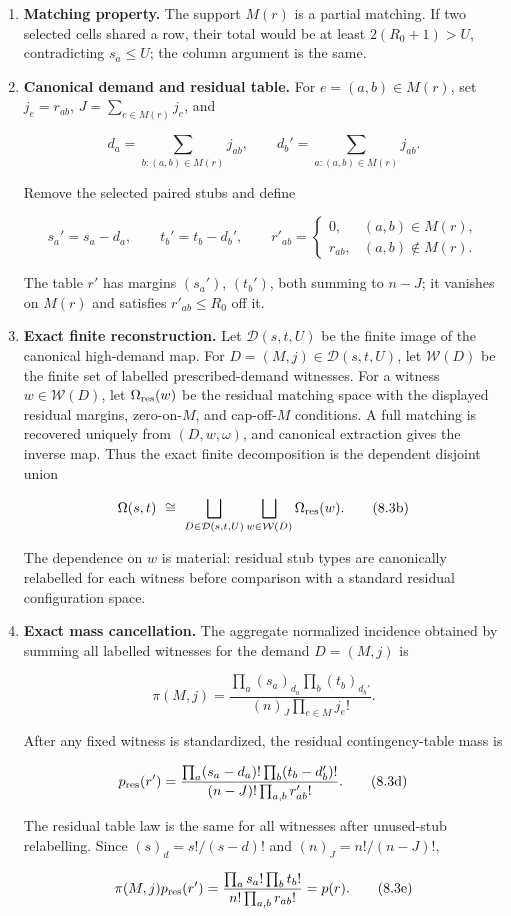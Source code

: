 \documentclass[11pt]{article}
\begin{document}
\begin{enumerate}
\def\labelenumi{\arabic{enumi}.}
\item
  \textbf{Matching property.} The support \(M(r)\) is a partial matching. If two selected cells shared a row, their total would be at least \(2(R_0+1)>U\), contradicting \(s_a\le U\); the column argument is the same.
\item
  \textbf{Canonical demand and residual table.} For \(e=(a,b)\in M(r)\), set \(j_e=r_{ab}\), \(J=\sum_{e\in M(r)}j_e\), and

  \[
   d_a=\sum_{b:(a,b)\in M(r)}j_{ab},
   \qquad
   d_b'=\sum_{a:(a,b)\in M(r)}j_{ab}.
  \]

  Remove the selected paired stubs and define

  \[
   s_a'=s_a-d_a,
   \qquad
   t_b'=t_b-d_b',
   \qquad
   r'_{ab}=\begin{cases}
      0,&(a,b)\in M(r),\\
      r_{ab},&(a,b)\notin M(r).
   \end{cases}
  \]

  The table \(r'\) has margins \((s_a')\), \((t_b')\), both summing to \(n-J\); it vanishes on \(M(r)\) and satisfies \(r'_{ab}\le R_0\) off it.
\item
  \textbf{Exact finite reconstruction.} Let \(\mathcal D(s,t,U)\) be the finite image of the canonical high-demand map. For \(D=(M,j)\in\mathcal D(s,t,U)\), let \(\mathcal W(D)\) be the finite set of labelled prescribed-demand witnesses. For a witness \(w\in\mathcal W(D)\), let \(\Omega_{\rm res}(w)\) be the residual matching space with the displayed residual margins, zero-on-\(M\), and cap-off-\(M\) conditions. A full matching is recovered uniquely from \((D,w,\omega)\), and canonical extraction gives the inverse map. Thus the exact finite decomposition is the dependent disjoint union

  \[
   \Omega(s,t)\ \cong\
   \bigsqcup_{D\in\mathcal D(s,t,U)}
     \bigsqcup_{w\in\mathcal W(D)}\Omega_{\rm res}(w).
   \tag{8.3b}
  \]

  The dependence on \(w\) is material: residual stub types are canonically relabelled for each witness before comparison with a standard residual configuration space.
\item
  \textbf{Exact mass cancellation.} The aggregate normalized incidence obtained by summing all labelled witnesses for the demand \(D=(M,j)\) is

  \[
   \pi(M,j)=
   \frac{\prod_a(s_a)_{d_a}\prod_b(t_b)_{d_b'}}
        {(n)_J\prod_{e\in M}j_e!}.
   \tag{8.3c}
  \]

  After any fixed witness is standardized, the residual contingency-table mass is

  \[
   p_{\rm res}(r')=
   \frac{\prod_a(s_a-d_a)!\prod_b(t_b-d_b')!}
        {(n-J)!\prod_{a,b}r'_{ab}!}.
   \tag{8.3d}
  \]

  The residual table law is the same for all witnesses after unused-stub relabelling. Since \((s)_d=s!/(s-d)!\) and \((n)_J=n!/(n-J)!\),

  \[
   \pi(M,j)p_{\rm res}(r')
   =\frac{\prod_a s_a!\prod_b t_b!}
          {n!\prod_{a,b}r_{ab}!}
   =p(r).
   \tag{8.3e}
  \]
\end{enumerate}
\end{document}
